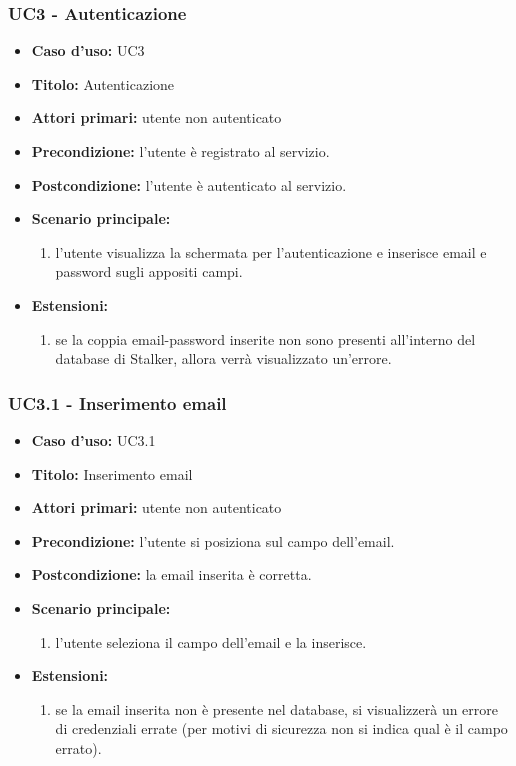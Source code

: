 \documentclass[casi-duso]{subfiles}
\begin{document}
\subsubsection{UC3 - Autenticazione}
\label{subsub:uc2utente}
\begin{itemize}
  \item \textbf{Caso d’uso:} UC3 
  \item \textbf{Titolo:} Autenticazione
  \item \textbf{Attori primari:} utente non autenticato
  \item \textbf{Precondizione:} l'utente è registrato al servizio.
  \item \textbf{Postcondizione:} l'utente è autenticato al servizio.
  \item \textbf{Scenario principale:} 
  \begin{enumerate}
    \item l'utente visualizza la schermata per l'autenticazione e inserisce email e password sugli appositi campi.
  \end{enumerate}  
  \item \textbf{Estensioni:} 
  \begin{enumerate}
    \item se la coppia email-password inserite non sono presenti all'interno del database di Stalker, allora verrà visualizzato un'errore.
  \end{enumerate}  
\end{itemize}

\subsubsection{UC3.1 - Inserimento email}
\label{subsub:uc2.1utente}
\begin{itemize}
  \item \textbf{Caso d’uso:} UC3.1 
  \item \textbf{Titolo:} Inserimento email
  \item \textbf{Attori primari:} utente non autenticato
  \item \textbf{Precondizione:} l'utente si posiziona sul campo dell'email.
  \item \textbf{Postcondizione:} la email inserita è corretta.
  \item \textbf{Scenario principale:} 
  \begin{enumerate}
    \item l'utente seleziona il campo dell'email e la inserisce.
  \end{enumerate}  
  \item \textbf{Estensioni:} 
  \begin{enumerate}
    \item se la email inserita non è presente nel database, si visualizzerà un errore di credenziali errate (per motivi di sicurezza
    non si indica qual è il campo errato).
  \end{enumerate}  
\end{itemize}
\end{document}
